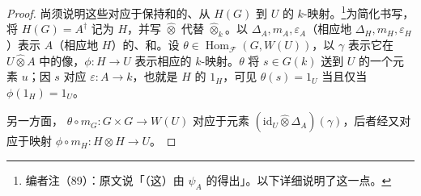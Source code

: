 \begin{proof}
尚须说明这些对应于保持和的、从 $H(G)$ 到 $U$ 的 $k$-映射。\footnote{编者注（89）：原文说「（这）由 $\psi_A$ 的得出」。以下详细说明了这一点。}为简化书写，将 $H(G)=A^\dagger$ 记为 $H$，并写 $\widehat\otimes$ 代替 $\widehat\otimes_k$。以 $\Delta_A,m_A,\varepsilon_A$（相应地 $\Delta_H,m_H,\varepsilon_H$）表示 $A$（相应地 $H$）的、和。设 $\theta\in\operatorname{Hom}_{\mathscr F}(G,W(U))$，以 $\gamma$ 表示它在 $U\widehat\otimes A$ 中的像，$\phi:H\to U$ 表示相应的 $k$-映射。$\theta$ 将 $s\in G(k)$ 送到 $U$ 的一个元素 $u$；因 $s$ 对应 $\varepsilon:A\to k$，也就是 $H$ 的 $1_H$，可见 $\theta(s)=1_U$ 当且仅当 $\phi(1_H)=1_U$。

另一方面， $\theta\circ m_G:G\times G\to W(U)$ 对应于元素 $(\mathrm{id}_U\widehat\otimes\Delta_A)(\gamma)$，后者经又对应于映射 $\phi\circ m_H:H\otimes H\to U$。


\end{proof}
